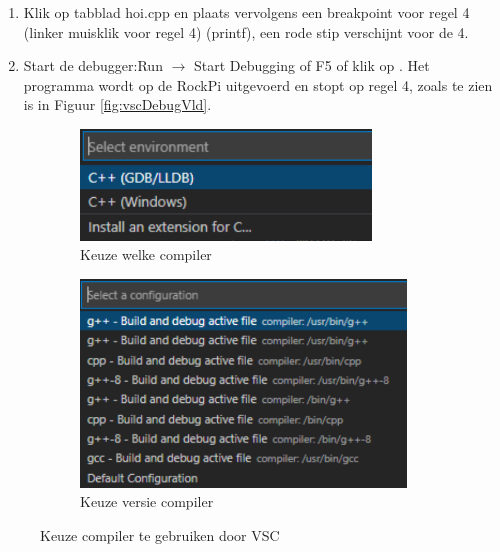 \begin{enumerate}
\begin{enumerate}
   \item Klik op tabblad hoi.cpp en plaats vervolgens een breakpoint voor regel 4 (linker muisklik voor regel 4) (printf), een rode stip verschijnt voor de 4. 
   \item Start de debugger:Run $\rightarrow$ Start Debugging of F5 of klik op . Het programma wordt op de RockPi uitgevoerd en stopt op regel 4, zoals te zien is in Figuur \ref{fig:vscDebugVld}.\newline
\end{enumerate}
     \begin{figure}[h!]
	\centering
	\begin{center} 	
		\begin{subfigure}[b]{0.44\textwidth}
			\includegraphics[width=0.85\textwidth]{figuren/VSCksGDB}
			\caption{Keuze welke compiler}
			\label{fig:kzComp}
		\end{subfigure}
		\begin{subfigure}[b]{0.45\textwidth}
			\includegraphics[width=0.95\textwidth]{figuren/VSCKsGcc}
			\caption{Keuze versie compiler}
			\label{fig:kzCompVer}
		\end{subfigure}
		\caption{Keuze compiler te gebruiken door VSC}
		\label{fig:kzcompiler}   
	\end{center}
\end{figure}


\end{enumerate}
